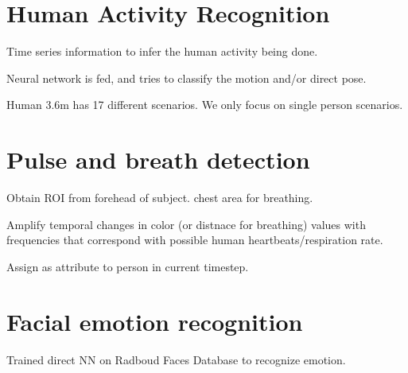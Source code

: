 \section{Human Activity Recognition}

Time series information to infer the human activity being done.

Neural network is fed, and tries to classify the motion and/or direct pose.

Human 3.6m has 17 different scenarios. We only focus on single person scenarios.


\section{Pulse and breath detection}

Obtain ROI from forehead of subject. chest area for breathing.

Amplify temporal changes in color (or distnace for breathing) values with frequencies that correspond with possible human heartbeats/respiration rate.

Assign as attribute to person in current timestep.

\section{Facial emotion recognition}

Trained direct NN on Radboud Faces Database to recognize emotion.
